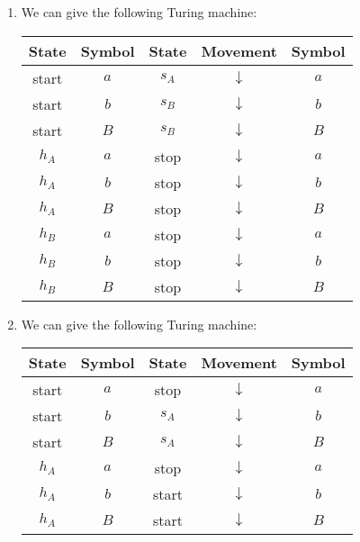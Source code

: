\begin{solution}
\begin{enumerate}
	\item We can give the following Turing machine:
	\begin{center}
	\begin{tabular}{|c|c||c|c|c|}
	\hline
	\textbf{State} & \textbf{Symbol} & \textbf{State} & \textbf{Movement} & \textbf{Symbol} \\
	\hline
	start & $a$ & $s_A$ & $\downarrow$ & $a$ \\
	\hline
	start & $b$ & $s_B$ & $\downarrow$ & $b$ \\
	\hline
	start & $B$ & $s_B$ & $\downarrow$ & $B$ \\
	\hline
	$h_A$ & $a$ & stop & $\downarrow$ & $a$ \\
	\hline
	$h_A$ & $b$ & stop & $\downarrow$ & $b$ \\
	\hline
	$h_A$ & $B$ & stop & $\downarrow$ & $B$ \\
	\hline
	$h_B$ & $a$ & stop & $\downarrow$ & $a$ \\
	\hline
	$h_B$ & $b$ & stop & $\downarrow$ & $b$ \\
	\hline
	$h_B$ & $B$ & stop & $\downarrow$ & $B$ \\
	\hline
	\end{tabular}
	\end{center}
	\item We can give the following Turing machine:
	\begin{center}
	\begin{tabular}{|c|c||c|c|c|}
	\hline
	\textbf{State} & \textbf{Symbol} & \textbf{State} & \textbf{Movement} & \textbf{Symbol} \\
	\hline
	start & $a$ & stop & $\downarrow$ & $a$ \\
	\hline
	start & $b$ & $s_A$ & $\downarrow$ & $b$ \\
	\hline
	start & $B$ & $s_A$ & $\downarrow$ & $B$ \\
	\hline
	$h_A$ & $a$ & stop & $\downarrow$ & $a$ \\
	\hline
	$h_A$ & $b$ & start & $\downarrow$ & $b$ \\
	\hline
	$h_A$ & $B$ & start & $\downarrow$ & $B$ \\
	\hline
	\end{tabular}
	\end{center}
\end{enumerate}
\end{solution}


